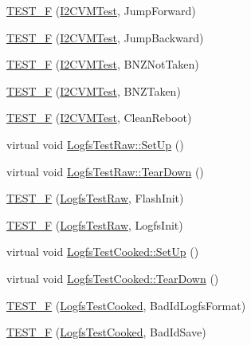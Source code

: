 \begin{DoxyCompactItemize}
\item 
\hyperlink{group___unit_tests_ga4eab1e697b804d9a3dd9e4f5ee823335}{\-T\-E\-S\-T\-\_\-\-F} (\hyperlink{class_i2_c_v_m_test}{\-I2\-C\-V\-M\-Test}, \-Jump\-Forward)
\item 
\hyperlink{group___unit_tests_ga0a2a0cd2cb3be12cfe7bd67968a819ae}{\-T\-E\-S\-T\-\_\-\-F} (\hyperlink{class_i2_c_v_m_test}{\-I2\-C\-V\-M\-Test}, \-Jump\-Backward)
\item 
\hyperlink{group___unit_tests_ga7b4336a0da271403b044b8293bd54169}{\-T\-E\-S\-T\-\_\-\-F} (\hyperlink{class_i2_c_v_m_test}{\-I2\-C\-V\-M\-Test}, \-B\-N\-Z\-Not\-Taken)
\item 
\hyperlink{group___unit_tests_ga84f66a747de5db897d49e1cfa0305685}{\-T\-E\-S\-T\-\_\-\-F} (\hyperlink{class_i2_c_v_m_test}{\-I2\-C\-V\-M\-Test}, \-B\-N\-Z\-Taken)
\item 
\hyperlink{group___unit_tests_ga56ccd9fbaa7cdef0485f6a89c4d700c3}{\-T\-E\-S\-T\-\_\-\-F} (\hyperlink{class_i2_c_v_m_test}{\-I2\-C\-V\-M\-Test}, \-Clean\-Reboot)
\item 
virtual void \hyperlink{group___unit_tests_ga6ad4da1f7c409b092a28457c4841e361}{\-Logfs\-Test\-Raw\-::\-Set\-Up} ()
\item 
virtual void \hyperlink{group___unit_tests_ga14c567025394faab5c7628decc578f1f}{\-Logfs\-Test\-Raw\-::\-Tear\-Down} ()
\item 
\hyperlink{group___unit_tests_gad0ffad42b546bb80c39d04c4d69466f0}{\-T\-E\-S\-T\-\_\-\-F} (\hyperlink{class_logfs_test_raw}{\-Logfs\-Test\-Raw}, \-Flash\-Init)
\item 
\hyperlink{group___unit_tests_ga253b9e2c592f3b3754c532aeea4968d4}{\-T\-E\-S\-T\-\_\-\-F} (\hyperlink{class_logfs_test_raw}{\-Logfs\-Test\-Raw}, \-Logfs\-Init)
\item 
virtual void \hyperlink{group___unit_tests_gafefb90c56c5d60e99e716775a5e60028}{\-Logfs\-Test\-Cooked\-::\-Set\-Up} ()
\item 
virtual void \hyperlink{group___unit_tests_gab1ca9799c18f4944962a0e5b88ca8c9d}{\-Logfs\-Test\-Cooked\-::\-Tear\-Down} ()
\item 
\hyperlink{group___unit_tests_gaa95ae577174d8bd9b9cc50f39e1e4cf3}{\-T\-E\-S\-T\-\_\-\-F} (\hyperlink{class_logfs_test_cooked}{\-Logfs\-Test\-Cooked}, \-Bad\-Id\-Logfs\-Format)
\item 
\hyperlink{group___unit_tests_ga6f8e4fff0ee826ffd2f764af9d8d971f}{\-T\-E\-S\-T\-\_\-\-F} (\hyperlink{class_logfs_test_cooked}{\-Logfs\-Test\-Cooked}, \-Bad\-Id\-Save)
\item 

\end{DoxyCompactItemize}
